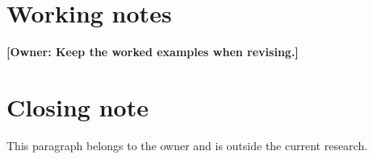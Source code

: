 \documentclass{article}
\theoremstyle{definition}
\newcommand{\taylor}[1]{\textbf{[Owner: #1]}}
\begin{document}
\section{Working notes}
\taylor{Keep the worked examples when revising.}

\section{Closing note}
This paragraph belongs to the owner and is outside the current research.
\end{document}
